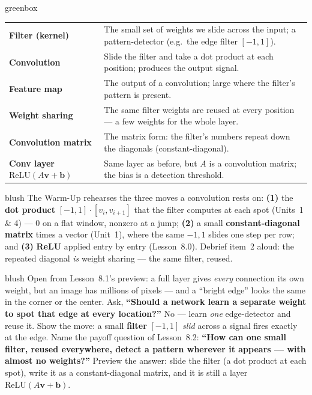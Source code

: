 \documentclass[10pt]{article}
\newcommand{\vv}{\mathbf{v}}
\newcommand{\bb}{\mathbf{b}}
\newcommand{\relu}{\mathrm{ReLU}}
\begin{document}
\begin{skillbox}{greenbox}
\renewcommand{\arraystretch}{1.3}
\begin{tabularx}{\linewidth}{@{}l X@{}}
\textbf{Filter (kernel)} & The small set of weights we slide across the input; a pattern-detector (e.g.\ the edge filter $[-1,1]$). \\
\textbf{Convolution} & Slide the filter and take a dot product at each position; produces the output signal. \\
\textbf{Feature map} & The output of a convolution; large where the filter's pattern is present. \\
\textbf{Weight sharing} & The same filter weights are reused at every position --- a few weights for the whole layer. \\
\textbf{Convolution matrix} & The matrix form: the filter's numbers repeat down the diagonals (constant-diagonal). \\
\textbf{Conv layer $\relu(A\vv+\bb)$} & Same layer as before, but $A$ is a convolution matrix; the bias is a detection threshold. \\
\end{tabularx}
\end{skillbox}

\begin{fixedskillbox}{blush}
    The Warm-Up rehearses the three moves a convolution rests on: \textbf{(1)} the \textbf{dot product}
    $[-1,1]\cdot[v_i,v_{i+1}]$ that the filter computes at each spot (Units~1 \& 4) --- $0$ on a flat window,
    nonzero at a jump; \textbf{(2)} a small \textbf{constant-diagonal matrix} times a vector (Unit~1), where the
    same $-1,1$ slides one step per row; and \textbf{(3)} \textbf{ReLU} applied entry by entry (Lesson~8.0).
    Debrief item~2 aloud: the repeated diagonal \emph{is} weight sharing --- the same filter, reused.
\end{fixedskillbox}

\begin{skillbox}[Hook]{blush}
    Open from Lesson~8.1's preview: a full layer gives \emph{every} connection its own weight, but an image has
    millions of pixels --- and a ``bright edge'' looks the same in the corner or the center. Ask, \textbf{``Should
    a network learn a separate weight to spot that edge at every location?''} No --- learn \emph{one}
    edge-detector and reuse it. Show the move: a small \textbf{filter} $[-1,1]$ \emph{slid} across a signal fires
    exactly at the edge. Name the payoff question of Lesson~8.2: \textbf{``How can one small filter, reused
    everywhere, detect a pattern wherever it appears --- with almost no weights?''} Preview the answer: slide the
    filter (a dot product at each spot), write it as a constant-diagonal matrix, and it is still a layer
    $\relu(A\vv+\bb)$.
\end{skillbox}
\end{document}
